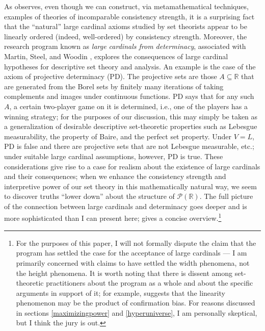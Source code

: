 \documentclass[letterpaper,12pt]{article}
\newcommand{\R}{\mathbb{R}}
\begin{document}
As \cite{sep-independence-large-cardinals} observes, even though we can construct, via metamathematical techniques, examples of theories of incomparable consistency strength, it is a surprising fact that the ``natural'' large cardinal axioms studied by set theorists appear to be linearly ordered (indeed, well-ordered) by consistency strength. Moreover, the research program known as \emph{large cardinals from determinacy}, associated with Martin, Steel, and Woodin \citep{koellner2010large}, explores the consequences of large cardinal hypotheses for descriptive set theory and analysis. An example is the case of the axiom of projective determinacy (PD). The projective sets are those $A \subseteq \R$ that are generated from the Borel sets by finitely many iterations of taking complements and images under continuous functions. PD says that for any such $A$, a certain two-player game on it is determined, i.e., one of the players has a winning strategy; for the purposes of our discussion, this may simply be taken as a generalization of desirable descriptive set-theoretic properties such as Lebesgue measurability, the property of Baire, and the perfect set property. Under $V = L$, PD is false and there are projective sets that are not Lebesgue measurable, etc.; under suitable large cardinal assumptions, however, PD is true. These considerations give rise to a case for realism about the existence of large cardinals and their consequences; when we enhance the consistency strength and interpretive power of our set theory in this mathematically natural way, we seem to discover truths ``lower down'' about the structure of $\mathcal{P}(\R)$. The full picture of the connection between large cardinals and determinacy goes deeper and is more sophisticated than I can present here; \cite{sep-large-cardinals-determinacy} gives a concise overview.\footnote{For the purposes of this paper, I will not formally dispute the claim that the program has settled the case for the acceptance of large cardinals --- I am primarily concerned with claims to have settled the width phenomena, not the height phenomena. It is worth noting that there is dissent among set-theoretic practitioners about the program as a whole and about the specific arguments in support of it; for example, \cite{hamkinsconfirmationbias2015} suggests that the linearity phenomenon may be the product of confirmation bias. For reasons discussed in sections \ref{maximizingpower} and \ref{hyperuniverse}, I am personally skeptical, but I think the jury is out.}
\end{document}
